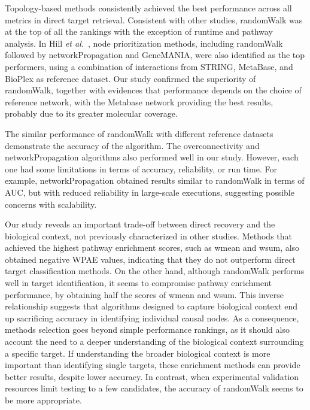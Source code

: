 Topology-based methods consistently achieved the best performance across all metrics in direct target retrieval. 
Consistent with other studies, randomWalk was at the top of all the rankings with the exception of runtime and pathway analysis.
In Hill \textit{et al.}~\cite{RN37}, node prioritization methods, including randomWalk followed by networkPropagation and GeneMANIA, were also identified as the top performers, using a combination of interactions from STRING, MetaBase, and BioPlex as reference dataset. 
Our study confirmed the superiority of randomWalk, together with evidences that performance depends on the choice of reference network, with the Metabase network providing the best results, probably due to its greater molecular coverage.

The similar performance of randomWalk with different reference datasets demonstrate the accuracy of the algorithm. 
The overconnectivity and networkPropagation algorithms also performed well in our study. 
However, each one had some limitations in terms of accuracy, reliability, or run time. 
For example, networkPropagation obtained results similar to randomWalk in terms of \gls{AUC}, but with reduced reliability in large-scale executions, suggesting possible concerns with scalability.

Our study reveals an important trade-off between direct recovery and the biological context, not previously characterized in other studies. 
Methods that achieved the highest pathway enrichment scores, such as wmean and wsum, also obtained negative \gls{WPAE} values, indicating that they do not outperform direct target classification methods. 
On the other hand, although randomWalk performs well in target identification, it seems to compromise pathway enrichment performance, by obtaining half the scores of wmean and wsum. 
This inverse relationship suggests that algorithms designed to capture biological context end up sacrificing accuracy in identifying individual causal nodes. 
As a consequence, methods selection goes beyond simple performance rankings, as it should also account the need to a deeper understanding of the biological context surrounding a specific target. 
If understanding the broader biological context is more important than identifying single targets, these enrichment methods can provide better results, despite lower accuracy. 
In contrast, when experimental validation resources limit testing to a few candidates, the accuracy of randomWalk seems to be more appropriate.

